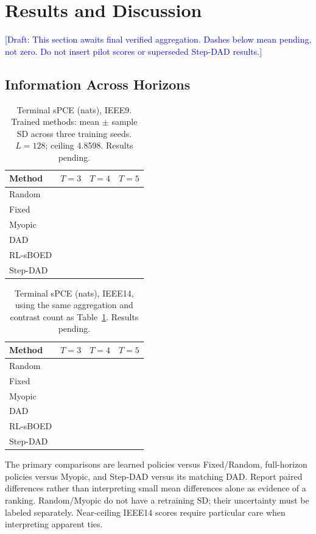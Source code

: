 \documentclass[conference]{IEEEtran}
\newcommand{\pending}{\textemdash}
\newcommand{\draftnote}[1]{\textcolor{blue}{[Draft: #1]}}
\begin{document}
\section{Results and Discussion}
\draftnote{This section awaits final verified aggregation. Dashes below mean
pending, not zero. Do not insert pilot scores or superseded Step-DAD results.}
\subsection{Information Across Horizons}
\begin{table}[t]
\caption{Terminal sPCE (nats), IEEE9. Trained methods: mean $\pm$ sample
SD across three training seeds. $L=128$; ceiling 4.8598. Results pending.}
\centering
\begin{tabular}{lccc}
\toprule Method & $T=3$ & $T=4$ & $T=5$\\\midrule
Random & \pending & \pending & \pending\\
Fixed & \pending & \pending & \pending\\
Myopic & \pending & \pending & \pending\\
DAD & \pending & \pending & \pending\\
RL-sBOED & \pending & \pending & \pending\\
Step-DAD & \pending & \pending & \pending\\\bottomrule
\end{tabular}
\label{tab:ieee9}
\end{table}
\begin{table}[t]
\caption{Terminal sPCE (nats), IEEE14, using the same aggregation and
contrast count as Table~\ref{tab:ieee9}. Results pending.}
\centering
\begin{tabular}{lccc}
\toprule Method & $T=3$ & $T=4$ & $T=5$\\\midrule
Random & \pending & \pending & \pending\\
Fixed & \pending & \pending & \pending\\
Myopic & \pending & \pending & \pending\\
DAD & \pending & \pending & \pending\\
RL-sBOED & \pending & \pending & \pending\\
Step-DAD & \pending & \pending & \pending\\\bottomrule
\end{tabular}
\label{tab:ieee14}
\end{table}
The primary comparisons are learned policies versus Fixed/Random,
full-horizon policies versus Myopic, and Step-DAD versus its matching DAD.
Report paired differences rather than interpreting small mean differences
alone as evidence of a ranking. Random/Myopic do not have a retraining SD;
their uncertainty must be labeled separately. Near-ceiling IEEE14 scores
require particular care when interpreting apparent ties.
\end{document}
